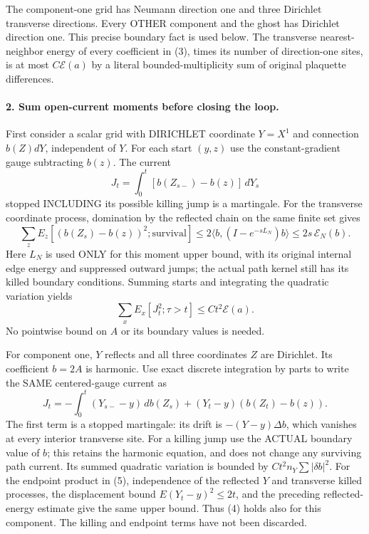 \documentclass[11pt]{article}
\begin{document}
The component-one grid has Neumann direction one and three Dirichlet
transverse directions. Every OTHER component and the ghost has
Dirichlet direction one. This precise boundary fact is used below.
The transverse nearest-neighbor energy of every coefficient in (3),
times its number of direction-one sites, is at most $C\mathcal E(a)$
by a literal bounded-multiplicity sum of original plaquette differences.

\paragraph{2. Sum open-current moments before closing the loop.}
First consider a scalar grid with DIRICHLET coordinate $Y=X^1$ and
connection $b(Z)dY$, independent of $Y$.
For each start $(y,z)$ use the constant-gradient gauge subtracting $b(z)$.
The current
\[
 J_t=\int_0^t[b(Z_{s-})-b(z)]\,dY_s
\]
stopped INCLUDING its possible killing jump is a martingale.
For the transverse coordinate process, domination by the reflected
chain on the same finite set gives
\[
 \sum_z E_z[(b(Z_s)-b(z))^2;\text{survival}]
 \le2\langle b,(I-e^{-sL_N})b\rangle
 \le2s\,\mathcal E_N(b).
\]
Here $L_N$ is used ONLY for this moment upper bound, with its original
internal edge energy and suppressed outward jumps; the actual path
kernel still has its killed boundary conditions.
Summing starts and integrating the quadratic variation yields
\[
 \sum_x E_x[J_t^2;\tau>t]\le C t^2\mathcal E(a).                  \tag{4}
\]
No pointwise bound on $A$ or its boundary values is needed.

For component one, $Y$ reflects and all three coordinates $Z$ are
Dirichlet. Its coefficient $b=2A$ is harmonic. Use exact discrete
integration by parts to write the SAME centered-gauge current as
\[
 J_t=-\int_0^t(Y_{s-}-y)\,db(Z_s)
                   +(Y_t-y)(b(Z_t)-b(z)).                      \tag{5}
\]
The first term is a stopped martingale: its drift is
$-(Y-y)\Delta b$, which vanishes at every interior transverse site.
For a killing jump use the ACTUAL boundary value of $b$; this retains
the harmonic equation, and does not change any surviving path current.
Its summed quadratic variation is bounded by
$Ct^2 n_Y\sum|\delta b|^2$.
For the endpoint product in (5), independence of the reflected $Y$
and transverse killed processes, the displacement bound
$E(Y_t-y)^2\le2t$, and the preceding reflected-energy estimate give
the same upper bound. Thus (4) holds also for this component.
The killing and endpoint terms have not been discarded.
\end{document}

